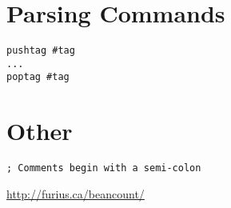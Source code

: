\documentclass[10pt,landscape]{article}
\begin{document}
\begin{multicols}{2}
\section{Parsing Commands}
\begin{verbatim}
pushtag #tag
...
poptag #tag
\end{verbatim}



\section{Other}
\begin{verbatim}
; Comments begin with a semi-colon
\end{verbatim}



\scriptsize

\href{http://furius.ca/beancount/}{http://furius.ca/beancount/}

\end{multicols}
\end{document}
